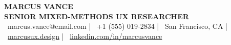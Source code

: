\documentclass[10pt]{article}
\begin{document}
\begin{center}
  {\fontsize{22}{26}\selectfont\bfseries\color{primary} MARCUS VANCE} \\[3pt]
  {\fontsize{10}{12}\selectfont\bfseries\color{secondary}\MakeUppercase{Senior Mixed-Methods UX Researcher}} \\[6pt]
  {\fontsize{8.5}{10.5}\selectfont\color{darktext}
    \faEnvelope~marcus.vance@email.com \quad | \quad 
    \faPhone~+1 (555) 019-2834 \quad | \quad 
    \faMapMarker~San Francisco, CA \quad | \quad 
    \faGlobe~\href{https://marcusux.design}{marcusux.design} \quad | \quad 
    \faLinkedin~\href{https://linkedin.com/in/marcusvance}{linkedin.com/in/marcusvance}
  }
\end{center}

\vspace{6pt}
\end{document}
